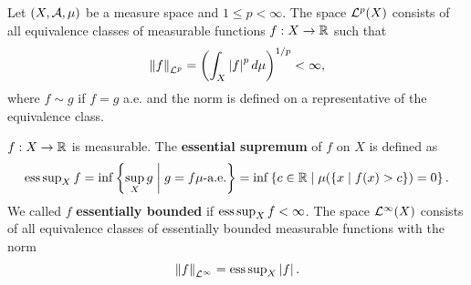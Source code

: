 \begin{definition}
    Let $(X,\mathcal{A},\mu)$ be a measure space and $1\leq p < \infty$. 
    The space $\mathcal{L}^p(X)$ consists of all equivalence classes of 
    measurable functions $f:X\to\mathbb{R}$ such that 
    \begin{equation*}
        \norm{f}_{\L^p} = \pth{\int_X \abs{f}^pd\mu}^{1/p} < \infty,
    \end{equation*} 
    where $f\sim g$ if $f = g$ a.e. and the norm is defined 
    on a representative of the equivalence class.
\end{definition}

\begin{definition}
    $f:X\to\mathbb{R}$ is measurable. The \textbf{essential supremum} of 
    $f$ on $X$ is defined as 
    \begin{equation*}
        \esssup_X f = \inf\Set{\sup_X g}{g = f \mu\text{-a.e.}}
        = \inf\Set{c\in\R}{\mu\pth{\Set{x}{f(x)>c}} = 0}.
    \end{equation*}
    We called $f$ \textbf{essentially bounded} if $\operatorname{ess\,sup}_X f < \infty$.
    The space $\mathcal{L}^\infty(X)$ consists of all equivalence classes 
    of essentially bounded measurable functions with the norm 
    \begin{equation*}
        \left\lVert {f} \right\rVert_{\mathcal{L}^\infty} = \operatorname{ess\,sup}_X\left\lvert {f} \right\rvert.
    \end{equation*}
\end{definition} 

